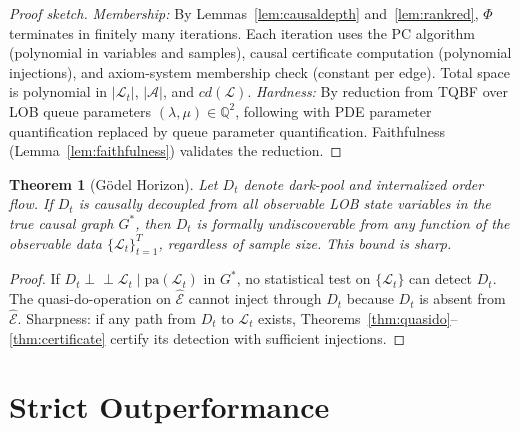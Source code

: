 \documentclass[12pt]{article}
\newtheorem{theorem}{Theorem}
\begin{document}
\begin{proof}[Proof sketch]
\textit{Membership:}
By Lemmas~\ref{lem:causaldepth} and~\ref{lem:rankred},
$\Phi$ terminates in finitely many iterations.
Each iteration uses the PC algorithm (polynomial in variables and samples),
causal certificate computation (polynomial injections),
and axiom-system membership check (constant per edge).
Total space is polynomial in $|\mathcal{L}_t|$, $|\mathcal{A}|$,
and $cd(\mathcal{L})$.
\textit{Hardness:}
By reduction from TQBF over LOB queue parameters
$(\lambda, \mu) \in \mathbb{Q}^2$,
following \citet{maes2026c} with PDE parameter quantification
replaced by queue parameter quantification.
Faithfulness (Lemma~\ref{lem:faithfulness}) validates the reduction.
\end{proof}

\begin{theorem}[G\"{o}del Horizon]
\label{thm:godel}
Let $D_t$ denote dark-pool and internalized order flow.
If $D_t$ is causally decoupled from all observable LOB state variables
in the true causal graph $G^*$, then $D_t$ is formally undiscoverable
from any function of the observable data
$\{\mathcal{L}_t\}_{t=1}^T$, regardless of sample size.
This bound is sharp.
\end{theorem}

\begin{proof}
If $D_t \perp\!\!\!\perp \mathcal{L}_t \mid \mathrm{pa}(\mathcal{L}_t)$
in $G^*$, no statistical test on $\{\mathcal{L}_t\}$ can detect $D_t$.
The quasi-do-operation on $\hat{\mathcal{E}}$ cannot inject through
$D_t$ because $D_t$ is absent from $\hat{\mathcal{E}}$.
Sharpness: if any path from $D_t$ to $\mathcal{L}_t$ exists,
Theorems~\ref{thm:quasido}--\ref{thm:certificate}
certify its detection with sufficient injections.
\end{proof}

\section{Strict Outperformance}
\label{sec:outperformance}
\end{document}
